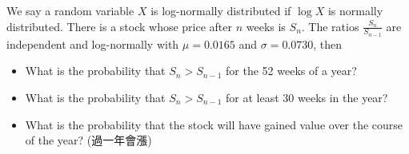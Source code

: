 \begin{eg}
    We say a random variable \(X\) is log-normally distributed if \(\log X\) is normally distributed. There is a stock whose price after \(n\) weeks is \(S_n\). The ratios \(\frac{S_n}{S_{n-1}}\) are independent and log-normally with \(\mu = 0.0165\) and \(\sigma = 0.0730\), then 
    \begin{itemize}
        \item [(1)] What is the probability that \(S_n > S_{n-1}\) for the 52 weeks of a year? 
        \item [(2)] What is the probability that \(S_n > S_{n-1}\) for at least 30 weeks in the year? 
        \item [(3)] What is the probability that the stock will have gained value over the course of the year? (過一年會漲)
    \end{itemize}       
\end{eg}
